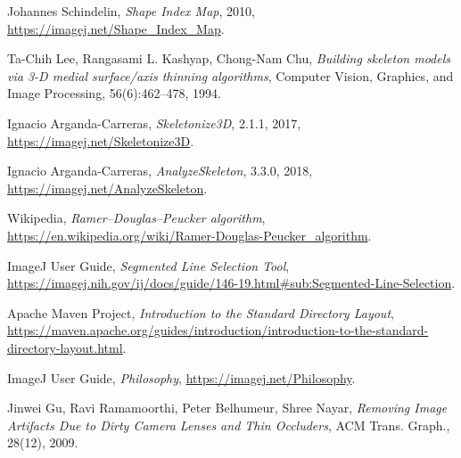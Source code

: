 \documentclass[declaration,shortabstract,mgr]{iithesis}
\begin{document}
\begin{thebibliography}{1}
  Johannes Schindelin,
  \emph{Shape Index Map},
  2010,
  \url{https://imagej.net/Shape_Index_Map}.

  Ta-Chih Lee, Rangasami L. Kashyap, Chong-Nam Chu,
  \emph{Building skeleton models via 3-D medial surface/axis thinning algorithms},
  Computer Vision, Graphics, and Image Processing,
  56(6):462--478,
  1994.

  Ignacio Arganda-Carreras,
  \emph{Skeletonize3D},
  2.1.1,
  2017,
  \url{https://imagej.net/Skeletonize3D}.

  Ignacio Arganda-Carreras,
  \emph{AnalyzeSkeleton},
  3.3.0,
  2018,
  \url{https://imagej.net/AnalyzeSkeleton}.
  
  Wikipedia,
  \emph{Ramer--Douglas--Peucker algorithm},
  \url{https://en.wikipedia.org/wiki/Ramer-Douglas-Peucker_algorithm}.
  
  ImageJ User Guide,
  \emph{Segmented Line Selection Tool},
  \url{https://imagej.nih.gov/ij/docs/guide/146-19.html#sub:Segmented-Line-Selection}.
  
  Apache Maven Project,
  \emph{Introduction to the Standard Directory Layout},
  \url{https://maven.apache.org/guides/introduction/introduction-to-the-standard-directory-layout.html}.

  ImageJ User Guide,
  \emph{Philosophy},
  \url{https://imagej.net/Philosophy}.

  Jinwei Gu, Ravi Ramamoorthi, Peter Belhumeur, Shree Nayar,
  \emph{Removing Image Artifacts Due to Dirty Camera Lenses and Thin Occluders},
  ACM Trans. Graph.,
  28(12),
  2009.

\end{thebibliography}
\end{document}
